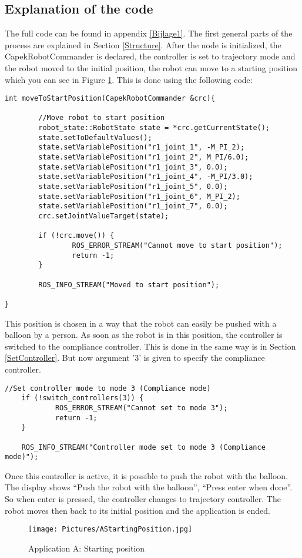 \documentclass[11pt,a4paper]{report}
\begin{document}
\subsection{Explanation of the code}
The full code can be found in appendix \ref{Bijlage1}.
The first general parts of the process are explained in Section \ref{Structure}.
After the node is initialized, the CapekRobotCommander is declared, the controller is set to trajectory mode and the robot moved to the initial position, the robot can move to a starting position which you can see in Figure \ref{fig:AStartingPosition}. This is done using the following code:
\begin{verbatim}
int moveToStartPosition(CapekRobotCommander &crc){

	    //Move robot to start position
	    robot_state::RobotState state = *crc.getCurrentState();
	    state.setToDefaultValues();
	    state.setVariablePosition("r1_joint_1", -M_PI_2);
	    state.setVariablePosition("r1_joint_2", M_PI/6.0);
	    state.setVariablePosition("r1_joint_3", 0.0);
	    state.setVariablePosition("r1_joint_4", -M_PI/3.0);
	    state.setVariablePosition("r1_joint_5", 0.0);
	    state.setVariablePosition("r1_joint_6", M_PI_2);
	    state.setVariablePosition("r1_joint_7", 0.0);
	    crc.setJointValueTarget(state);

	    if (!crc.move()) {
		        ROS_ERROR_STREAM("Cannot move to start position");
		        return -1;
	    }

	    ROS_INFO_STREAM("Moved to start position");

}
\end{verbatim}
\newpage
This position is chosen in a way that the robot can easily be pushed with a balloon by a person. As soon as the robot is in this position, the controller is switched to the compliance controller. This is done in the same way is in Section \ref{SetController}. But now argument '3' is given to specify the compliance controller.
\begin{verbatim}
//Set controller mode to mode 3 (Compliance mode)
	if (!switch_controllers(3)) {
		    ROS_ERROR_STREAM("Cannot set to mode 3");
		    return -1;
	}
	
	ROS_INFO_STREAM("Controller mode set to mode 3 (Compliance mode)");
\end{verbatim}
Once this controller is active, it is possible to push the robot with the balloon. The display shows ``Push the robot with the balloon'', ``Press enter when done''. So when enter is pressed, the controller changes to trajectory controller. The robot moves then back to its initial position and the application is ended.
\begin{figure}[!ht]
	\centering
	\texttt{[image: Pictures/AStartingPosition.jpg]}
	\caption{Application A: Starting position}
	\label{fig:AStartingPosition}
\end{figure}
\newpage
\end{document}
